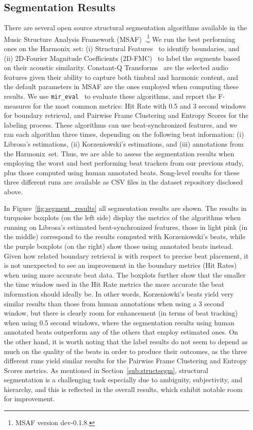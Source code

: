 \documentclass{article}
\newcommand{\setName}{Harmonix}
\begin{document}
\subsection{Segmentation Results}

There are several open source structural segmentation algorithms available in the Music Structure Analysis Framework (MSAF)~\cite{Nieto2016}.\footnote{MSAF version dev-0.1.8.}
We run the best performing ones on the \setName~set: (i) Structural Features~\cite{Serra2014} to identify boundaries, and (ii) 2D-Fourier Magnitude Coefficients (2D-FMC)~\cite{Nieto2014} to label the segments based on their acoustic similarity.
Constant-Q Transforms~\cite{Schorkhuber2010} are the selected audio features given their ability to capture both timbral and harmonic content, and the default parameters in MSAF are the ones employed when computing these results.
We use \texttt{mir\_eval}~\cite{Raffel2014} to evaluate these algorithms, and report the F-measures for the most common metrics: Hit Rate with 0.5 and 3 second windows for boundary retrieval, and Pairwise Frame Clustering and Entropy Scores for the labeling process.
These algorithms can use beat-synchronized features, and we ran each algorithm three times, depending on the following beat information: (i) Librosa's estimations, (ii) Korzeniowski's estimations, and (iii) annotations from the \setName~set.
Thus, we are able to assess the segmentation results when employing the worst and best performing beat trackers from our previous study, plus those computed using human annotated beats.
Song-level results for these three different runs are available as CSV files in the dataset repository disclosed above.

In Figure~\ref{fig:segment_results} all segmentation results are shown.
The results in turquoise boxplots (on the left side) display the metrics of the algorithms when running on Librosa's estimated beat-synchronized features, those in light pink (in the middle) correspond to the results computed with Korzeniowski's beats, while the purple boxplots (on the right) show those using annotated beats instead.
Given how related boundary retrieval is with respect to precise beat placement, it is not unexpected to see an improvement in the boundary metrics (Hit Rates) when using more accurate beat data.
The boxplots further show that the smaller the time window used in the Hit Rate metrics the more accurate the beat information should ideally be.
In other words, Korzeniowki's beats yield very similar results than those from human annotations when using a 3 second window, but there is clearly room for enhancement (in terms of beat tracking) when using 0.5 second windows, where the segmentation results using human annotated beats outperform any of the others that employ estimated ones.
On the other hand, it is worth noting that the label results do not seem to depend as much on the quality of the beats in order to produce their outcomes, as the three different runs yield similar results for the Pairwise Frame Clustering and Entropy Scores metrics.
As mentioned in Section~\ref{sub:structsegm}, structural segmentation is a challenging task especially due to ambiguity, subjectivity, and hierarchy, and this is reflected in the overall results, which exhibit notable room for improvement.
\end{document}
